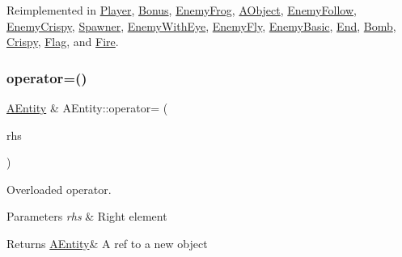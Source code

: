Reimplemented in \hyperlink{class_player_afcf86538719baa2f5c81d0b90263c41a}{Player}, \hyperlink{class_bonus_a976414b70e76b18dadeae3f316a22547}{Bonus}, \hyperlink{class_enemy_frog_adb2293192dd66ee46da359833475915b}{Enemy\+Frog}, \hyperlink{class_a_object_afa83ef1c900a47453524219788327b86}{A\+Object}, \hyperlink{class_enemy_follow_a09963fbac6d395dbf653b6353412cf2b}{Enemy\+Follow}, \hyperlink{class_enemy_crispy_a87a926e52fd94e7307baaad8cb1b4977}{Enemy\+Crispy}, \hyperlink{class_spawner_a274d6abcfeb55784de07f3c36ae923ce}{Spawner}, \hyperlink{class_enemy_with_eye_afe1006e6d3cdba1365bbc29fcc9f71b0}{Enemy\+With\+Eye}, \hyperlink{class_enemy_fly_a8957442e19b91b06bf1f3bb650d66a8c}{Enemy\+Fly}, \hyperlink{class_enemy_basic_a898943e397eb36c80721951a3457178c}{Enemy\+Basic}, \hyperlink{class_end_a1c57c2279d61916ea97aed566e8b3663}{End}, \hyperlink{class_bomb_a4a3f751937f59953f4cf585b07c9684c}{Bomb}, \hyperlink{class_crispy_aef91bfa94d0506d25b4cf78098e57912}{Crispy}, \hyperlink{class_flag_abdb7a9ef47dd6ea6a24beec99b372f11}{Flag}, and \hyperlink{class_fire_ae6456b9911e675ed1fb030f5f9e89cc8}{Fire}.

\mbox{\label{class_a_entity_a6eddf1d64b54976fbb9286b477fe19d7}} 
\subsubsection{\texorpdfstring{operator=()}{operator=()}}
{\footnotesize\ttfamily \hyperlink{class_a_entity}{A\+Entity} \& A\+Entity\+::operator= (\begin{DoxyParamCaption}\item[{const \hyperlink{class_a_entity}{A\+Entity} \&}]{rhs }\end{DoxyParamCaption})}



Overloaded operator. 


\begin{DoxyParams}{Parameters}
{\em rhs} & Right element \\
\hline
\end{DoxyParams}
\begin{DoxyReturn}{Returns}
\hyperlink{class_a_entity}{A\+Entity}\& A ref to a new object 
\end{DoxyReturn}
\mbox{\label{class_a_entity_ae2faa1d11e21033a223fef2bc03b9338}} 

